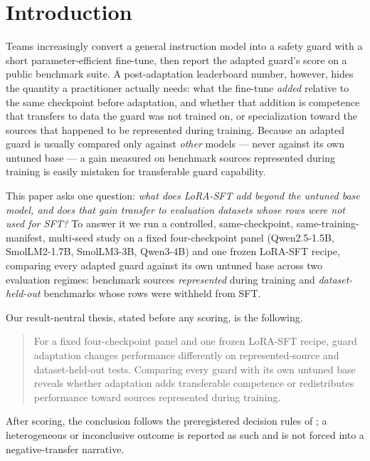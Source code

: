 \documentclass[sigconf,nonacm]{acmart}
\begin{document}
\section{Introduction}
\label{sec:intro}

Teams increasingly convert a general instruction model into a safety guard with a short parameter-efficient fine-tune, then report the adapted guard's score on a public benchmark suite. A post-adaptation leaderboard number, however, hides the quantity a practitioner actually needs: what the fine-tune \emph{added} relative to the same checkpoint before adaptation, and whether that addition is competence that transfers to data the guard was not trained on, or specialization toward the sources that happened to be represented during training. Because an adapted guard is usually compared only against \emph{other} models --- never against its own untuned base --- a gain measured on benchmark sources represented during training is easily mistaken for transferable guard capability.

This paper asks one question: \emph{what does LoRA-SFT add beyond the untuned base model, and does that gain transfer to evaluation datasets whose rows were not used for SFT?} To answer it we run a controlled, same-checkpoint, same-training-manifest, multi-seed study on a fixed four-checkpoint panel (Qwen2.5-1.5B, SmolLM2-1.7B, SmolLM3-3B, Qwen3-4B) and one frozen LoRA-SFT recipe, comparing every adapted guard against its own untuned base across two evaluation regimes: benchmark sources \emph{represented} during training and \emph{dataset-held-out} benchmarks whose rows were withheld from SFT.

Our result-neutral thesis, stated before any scoring, is the following.

\begin{quote}
For a fixed four-checkpoint panel and one frozen LoRA-SFT recipe, guard adaptation changes performance differently on represented-source and dataset-held-out tests. Comparing every guard with its own untuned base reveals whether adaptation adds transferable competence or redistributes performance toward sources represented during training.
\end{quote}

After scoring, the conclusion follows the preregistered decision rules of ; a heterogeneous or inconclusive outcome is reported as such and is not forced into a negative-transfer narrative.
\end{document}
